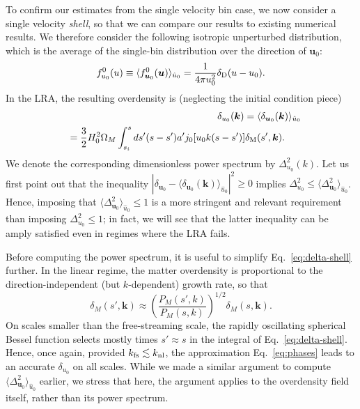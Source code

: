 \documentclass[useAMS, usenatbib]{mnras}
\newcommand{\beq}{\begin{equation}}
\newcommand{\eeq}{\end{equation}}
\newcommand{\barr}{\begin{eqnarray}}
\newcommand{\earr}{\end{eqnarray}}
\newcommand{\bs}{\boldsymbol}
\begin{document}
To confirm our estimates from the single velocity bin case, we now consider a single velocity \emph{shell}, so that we can compare our results to existing numerical results. We therefore consider the following isotropic unperturbed distribution, which is the average of the single-bin distribution over the direction of $\bs{u}_0$:
\beq
f^0_{u_0}(u) \equiv \langle f_{\bs{u}_0}^0 (\bs{u}) \rangle_{\hat{u}_0} = \frac1{4 \pi u_0^2} \delta_{\rm D}(u- u_0).
\eeq
In the LRA, the resulting overdensity is (neglecting the initial condition piece)
\barr
&&\delta_{u_0}(\bs{k}) = \langle \delta_{\bs{u}_0}(\bs{k}) \rangle_{\hat{u}_0} \nonumber\\
&&= \frac32 H_0^2 \Omega_M \int_{s_i}^s ds' (s - s') a' j_0[u_0 k (s - s')] \delta_{\rm M}(s', \bs{k}).~~~~~ \label{eq:delta-shell}
\earr
We denote the corresponding dimensionless power spectrum by $\Delta^2_{u_0}(k)$. Let us first point out that the inequality $|\delta_{\bs{u}_0} - \langle \delta_{\bs{u}_0}(\bs{k}) \rangle_{\hat{u}_0}|^2 \geq 0$ implies $\Delta^2_{u_0} \leq \langle \Delta^2_{\bs{u}_0} \rangle_{\hat{u}_0}$. Hence, imposing that $\langle \Delta^2_{\bs{u}_0} \rangle_{\hat{u}_0} \leq 1$ is a more stringent and relevant requirement than imposing $\Delta^2_{u_0} \leq 1$; in fact, we will see that the latter inequality can be amply satisfied even in regimes where the LRA fails.

Before computing the power spectrum, it is useful to simplify Eq.~\eqref{eq:delta-shell} further. In the linear regime, the matter overdensity is proportional to the direction-independent (but $k$-dependent) growth rate, so that
\beq
\delta_M(s', \bs{k}) \approx \left(\frac{P_M(s', k)}{P_M(s, k)}\right)^{1/2} \delta_M(s, \bs{k}). \label{eq:phases}
\eeq
On scales smaller than the free-streaming scale, the rapidly oscillating spherical Bessel function selects mostly times $s' \approx s$ in the integral of Eq.~\eqref{eq:delta-shell}. Hence, once again, provided $k_{\rm fs} \lesssim k_{\rm nl}$, the approximation Eq.~\eqref{eq:phases} leads to an accurate $\delta_{u_0}$ on all scales. While we made a similar argument to compute $\langle \Delta^2_{\bs{u}_0} \rangle_{\hat{u}_0}$ earlier, we stress that here, the argument applies to the overdensity field itself, rather than its power spectrum.
\end{document}
